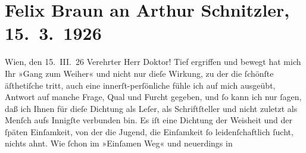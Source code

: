 

         
         \renewcommand{\erwaehntePersonen}{Personen: Johann Wolfgang von Goethe}
         \renewcommand{\erwaehnteOrte}{Orte: Badisches Staatstheater, Karlsruhe, Wien}
         \renewcommand{\erwaehnteWerke}{Werke: Der Gang zum Weiher. Dramatische Dichtung, Der einsame Weg. Schauspiel in fünf Akten, Komödie der Verführung. In drei Akten, Tantalos}
               \section[Felix Braun an Arthur Schnitzler, 15. 3. 1926]{ Felix Braun an Arthur Schnitzler, 15. 3. 1926}\nopagebreak{}\rehead{ }\begin{ledgroupsized}[t]{13cm}\normalsize\beginnumbering \toendnotes[C]{\smallbreak\pagebreak[2]} 
\toendnotes[C]{\smallbreak}\pstart
           \centering{}{\pb}Wien, den 15. III. 26\pend
           \pstart{}Verehrter Herr Doktor!\pend\pstart
           Tief ergriffen und bewegt hat mich Ihr »Gang zum
                  Weiher« und nicht nur dieſe Wirkung, zu der die ſchönſte äſthetiſche tritt,
               auch eine innerſt-perſönliche fühle ich auf mich ausgeübt, Antwort auf manche Frage,
               Qual und Furcht gegeben, und ſo kann ich nur ſagen, daß ich Ihnen für dieſe Dichtung
               als Leſer, als Schriftſteller und nicht zuletzt als Menſch aufs Innigſte verbunden
               bin.\pend
           \pstart
           Es iſt eine Dichtung der Weisheit und der ſpäten Einſamkeit, von der die Jugend, die
               Einſamkeit ſo leidenſchaftlich ſucht, nichts {\pb}ahnt.
               Wie ſchon im »Einſamen Weg« und neuerdings in

\end{ledgroupsized}
